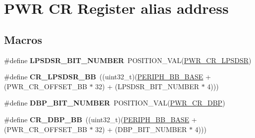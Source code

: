 \hypertarget{group___p_w_r___c_r__register__alias}{\section{P\-W\-R C\-R Register alias address}
\label{group___p_w_r___c_r__register__alias}
}
\subsection*{Macros}
\begin{DoxyCompactItemize}
\item 
\hypertarget{group___p_w_r___c_r__register__alias_ga944590f80b693c566f1aa4e56102e836}{\#define {\bfseries L\-P\-S\-D\-S\-R\-\_\-\-B\-I\-T\-\_\-\-N\-U\-M\-B\-E\-R}~P\-O\-S\-I\-T\-I\-O\-N\-\_\-\-V\-A\-L(\hyperlink{group___peripheral___registers___bits___definition_ga4e3d6a1e77ba526a2bc43343916f0e79}{P\-W\-R\-\_\-\-C\-R\-\_\-\-L\-P\-S\-D\-S\-R})}\label{group___p_w_r___c_r__register__alias_ga944590f80b693c566f1aa4e56102e836}

\item 
\hypertarget{group___p_w_r___c_r__register__alias_ga09f81eb80d4d8bf7caaed4466673fa84}{\#define {\bfseries C\-R\-\_\-\-L\-P\-S\-D\-S\-R\-\_\-\-B\-B}~((uint32\-\_\-t)(\hyperlink{group___peripheral__memory__map_gaed7efc100877000845c236ccdc9e144a}{P\-E\-R\-I\-P\-H\-\_\-\-B\-B\-\_\-\-B\-A\-S\-E} + (P\-W\-R\-\_\-\-C\-R\-\_\-\-O\-F\-F\-S\-E\-T\-\_\-\-B\-B $\ast$ 32) + (L\-P\-S\-D\-S\-R\-\_\-\-B\-I\-T\-\_\-\-N\-U\-M\-B\-E\-R $\ast$ 4)))}\label{group___p_w_r___c_r__register__alias_ga09f81eb80d4d8bf7caaed4466673fa84}

\item 
\hypertarget{group___p_w_r___c_r__register__alias_ga398aef263adbda7c1f1dc9020fde83f3}{\#define {\bfseries D\-B\-P\-\_\-\-B\-I\-T\-\_\-\-N\-U\-M\-B\-E\-R}~P\-O\-S\-I\-T\-I\-O\-N\-\_\-\-V\-A\-L(\hyperlink{group___peripheral___registers___bits___definition_gaf5c65ab845794ef48f09faa2ee44f718}{P\-W\-R\-\_\-\-C\-R\-\_\-\-D\-B\-P})}\label{group___p_w_r___c_r__register__alias_ga398aef263adbda7c1f1dc9020fde83f3}

\item 
\hypertarget{group___p_w_r___c_r__register__alias_ga799ab60bdbcfc1076cf2d7f206d09b0c}{\#define {\bfseries C\-R\-\_\-\-D\-B\-P\-\_\-\-B\-B}~((uint32\-\_\-t)(\hyperlink{group___peripheral__memory__map_gaed7efc100877000845c236ccdc9e144a}{P\-E\-R\-I\-P\-H\-\_\-\-B\-B\-\_\-\-B\-A\-S\-E} + (P\-W\-R\-\_\-\-C\-R\-\_\-\-O\-F\-F\-S\-E\-T\-\_\-\-B\-B $\ast$ 32) + (D\-B\-P\-\_\-\-B\-I\-T\-\_\-\-N\-U\-M\-B\-E\-R $\ast$ 4)))}\label{group___p_w_r___c_r__register__alias_ga799ab60bdbcfc1076cf2d7f206d09b0c}


\end{DoxyCompactItemize}
